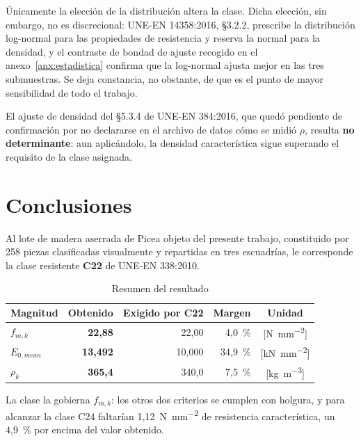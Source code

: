 \documentclass[11pt,a4paper]{article}
\begin{document}
\noindent Únicamente la elección de la distribución altera la clase. Dicha elección, sin
embargo, no es discrecional: UNE-EN 14358:2016, \S3.2.2, prescribe la distribución
log-normal para las propiedades de resistencia y reserva la normal para la densidad, y
el contraste de bondad de ajuste recogido en el anexo~\ref{anx:estadistica} confirma que
la log-normal ajusta mejor en las tres submuestras. Se deja constancia, no obstante, de
que es el punto de mayor sensibilidad de todo el trabajo.

\medskip
\noindent El ajuste de densidad del \S5.3.4 de UNE-EN 384:2016, que quedó pendiente de
confirmación por no declararse en el archivo de datos cómo se midió $\rho$, resulta
\textbf{no determinante}: aun aplicándolo, la densidad característica sigue superando el
requisito de la clase asignada.

\section{Conclusiones}

\noindent Al lote de madera aserrada de Picea objeto del presente trabajo, constituido por 258 piezas clasificadas visualmente y repartidas en tres escuadrías, le corresponde la clase resistente \textbf{C22} de UNE-EN 338:2010.

\begin{table}[H]
\centering
\caption{Resumen del resultado}
\begin{tabular}{l r r r c}
\toprule
\textbf{Magnitud} & \textbf{Obtenido} & \textbf{Exigido por C22} & \textbf{Margen} & \textbf{Unidad} \\
\midrule
$f_{m,k}$ & \textbf{22,88} & 22,00 & 4,0~\si{\percent} & [\si{\newton\per\square\milli\meter}] \\
$E_{0,mean}$ & \textbf{13,492} & 10,000 & 34,9~\si{\percent} & [\si{\kilo\newton\per\square\milli\meter}] \\
$\rho_{k}$ & \textbf{365,4} & 340,0 & 7,5~\si{\percent} & [\si{\kilo\gram\per\cubic\meter}] \\
\bottomrule
\end{tabular}
\end{table}

\noindent La clase la gobierna $f_{m,k}$: los otros dos criterios se cumplen con holgura, y para alcanzar la clase C24 faltarían 1,12~\si{\newton\per\square\milli\meter} de resistencia característica, un 4,9~\si{\percent} por encima del valor obtenido.
\end{document}
